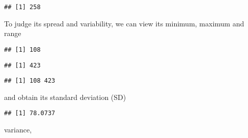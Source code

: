 \documentclass[]{book}
\newenvironment{Shaded}{\begin{snugshade}}{\end{snugshade}}
\newcommand{\KeywordTok}[1]{\textcolor[rgb]{0.13,0.29,0.53}{\textbf{{#1}}}}
\newcommand{\NormalTok}[1]{{#1}}
\theoremstyle{definition}
\theoremstyle{definition}
\theoremstyle{remark}
\begin{document}
\begin{verbatim}
## [1] 258
\end{verbatim}

To judge its spread and variability, we can view its minimum, maximum
and range

\begin{Shaded}
\end{Shaded}

\begin{verbatim}
## [1] 108
\end{verbatim}

\begin{Shaded}
\end{Shaded}

\begin{verbatim}
## [1] 423
\end{verbatim}

\begin{Shaded}
\end{Shaded}

\begin{verbatim}
## [1] 108 423
\end{verbatim}

and obtain its standard deviation (SD)

\begin{Shaded}
\end{Shaded}

\begin{verbatim}
## [1] 78.0737
\end{verbatim}

variance,

\begin{Shaded}
\end{Shaded}
\end{document}
